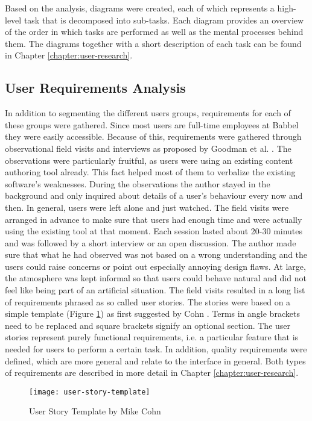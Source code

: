 Based on the analysis, diagrams were created, each of which represents a high-level task that is decomposed into sub-tasks. Each diagram provides an overview of the order in which tasks are performed as well as the mental processes behind them. The diagrams together with a short description of each task can be found in Chapter \ref{chapter:user-research}.

\subsection{User Requirements Analysis}
In addition to segmenting the different users groups, requirements for each of these groups were gathered. Since most users are full-time employees at Babbel they were easily accessible. Because of this, requirements were gathered through observational field visits and interviews as proposed by Goodman et al. \cite{goodman_observing_2012}. The observations were particularly fruitful, as users were using an existing content authoring tool already. This fact helped most of them to verbalize the existing software's weaknesses. During the observations the author stayed in the background and only inquired about details of a user's behaviour every now and then. In general, users were left alone and just watched. The field visits were arranged in advance to make sure that users had enough time and were actually using the existing tool at that moment. Each session lasted about 20-30 minutes and was followed by a short interview or an open discussion. The author made sure that what he had observed was not based on a wrong understanding and the users could raise concerns or point out especially annoying design flaws. At large, the atmosphere was kept informal so that users could behave natural and did not feel like being part of an artificial situation. The field visits resulted in a long list of requirements phrased as so called user stories. The stories were based on a simple template (Figure \ref{fig:user-story-template}) as first suggested by Cohn \cite{_user_2004}. Terms in angle brackets need to be replaced and square brackets signify an optional section. The user stories represent purely functional requirements, i.e. a particular feature that is needed for users to perform a certain task. In addition, quality requirements were defined, which are more general and relate to the interface in general. Both types of requirements are described in more detail in Chapter \ref{chapter:user-research}.

\begin{figure}[h!]
\centering
\texttt{[image: user-story-template]}
\caption{User Story Template by Mike Cohn}
\label{fig:user-story-template}
\end{figure}

